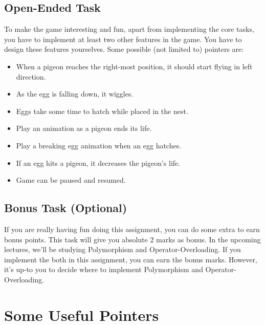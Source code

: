 \documentclass[a4paper,12pt]{article}
\begin{document}
	\subsection{Open-Ended Task}
		To make the game interesting and fun, apart from implementing the core tasks, you have to implement at least two other features in the game. You have to design these features yourselves. Some possible (not limited to) pointers are:
	\begin{itemize}
		\item When a pigeon reaches the right-most position, it should start flying in left direction.
		\item As the egg is falling down, it wiggles.
		\item Eggs take some time to hatch while placed in the nest.
		\item Play an animation as a pigeon ends its life.
		\item Play a breaking egg animation when an egg hatches.
		\item If an egg hits a pigeon, it decreases the pigeon's life.
		\item Game can be paused and resumed.
	\end{itemize}		
		 
	\subsection{Bonus Task (Optional)}
		If you are really having fun doing this assignment, you can do some extra to earn bonus points. This task will give you absolute 2 marks as bonus. In the upcoming lectures, we'll be studying Polymorphism and Operator-Overloading. If you implement the both in this assignment, you can earn the bonus marks. However, it's up-to you to decide where to implement Polymorphism and Operator-Overloading.
	\section{Some Useful Pointers}
	
\end{document}
